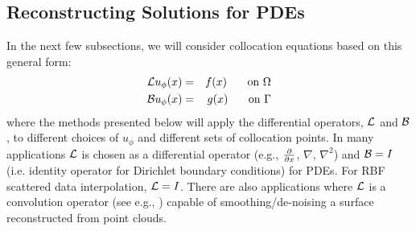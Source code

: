 \documentclass[11pt]{report}
\begin{document}
{\subsection{Reconstructing Solutions for PDEs}
In the next few subsections, we will consider collocation equations based on this general form: 
\begin{eqnarray*}
\mathcal{L}u_\phi(x) &=& f(x) \hskip1.5em \textrm{ on } \Omega \label{eqn:colloc_interior}\\ 
\mathcal{B}u_\phi(x) &=& g(x) \hskip1.5em \textrm{ on } \Gamma  \label{eqn:colloc_boundary} 
\end{eqnarray*}
where the methods presented below will apply the differential operators, $\mathcal{L}$ and $\mathcal{B}$, to different choices of $u_\phi$ and different sets of collocation points. In many applications $\mathcal{L}$ is chosen as a differential operator (e.g., $\frac{\partial }{\partial x}$, $\nabla$, $\nabla^2$) and $\mathcal{B}= I$ (i.e. identity operator for Dirichlet boundary conditions) for PDEs. For RBF scattered data interpolation, $\mathcal{L} = I$. There are also  applications where $\mathcal{L}$ is a convolution operator (see e.g., \cite{Carr2001, Carr2003}) capable of smoothing/de-noising a surface reconstructed from point clouds. 

}
\end{document}
